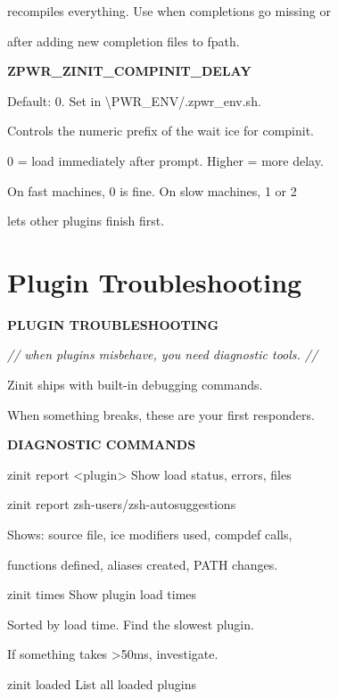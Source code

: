 \documentclass[11pt,a4paper,twoside]{book}
\begin{document}
recompiles everything. Use when completions go missing or

after adding new completion files to fpath.


\vspace{12pt}
{\bfseries\color{neonyellow} ZPWR\_ZINIT\_COMPINIT\_DELAY}\vspace{4pt}

Default: 0. Set in \textbackslash{}PWR\_ENV/.zpwr\_env.sh.

Controls the numeric prefix of the wait ice for compinit.

0 = load immediately after prompt. Higher = more delay.

On fast machines, 0 is fine. On slow machines, 1 or 2

lets other plugins finish first.


\vspace{16pt}

\section{Plugin Troubleshooting}


\vspace{10pt}
{\large\bfseries\color{neoncyan} PLUGIN TROUBLESHOOTING}\vspace{6pt}

{\small\itshape\color{dimtext} // when plugins misbehave, you need diagnostic tools. //}

Zinit ships with built-in debugging commands.

When something breaks, these are your first responders.


\vspace{12pt}
{\bfseries\color{neonyellow} DIAGNOSTIC COMMANDS}\vspace{4pt}

zinit report <plugin>      Show load status, errors, files

zinit report zsh-users/zsh-autosuggestions

Shows: source file, ice modifiers used, compdef calls,

functions defined, aliases created, PATH changes.

zinit times               Show plugin load times

Sorted by load time. Find the slowest plugin.

If something takes >50ms, investigate.

zinit loaded              List all loaded plugins
\end{document}

